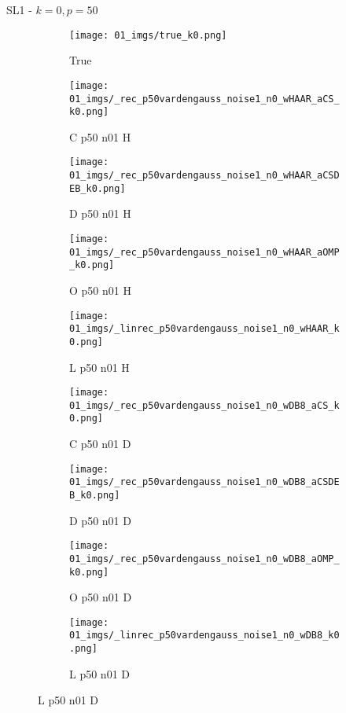 \begin{frame}{SL1 - $k=0,p=50$}{}
\begin{figure}
\begin{subfigure}{0.1\textwidth}
\texttt{[image: 01\_imgs/true\_k0.png]}
\caption*{\Tiny True}
\end{subfigure}
\begin{subfigure}{0.1\textwidth}
\texttt{[image: 01\_imgs/\_rec\_p50vardengauss\_noise1\_n0\_wHAAR\_aCS\_k0.png]}
\caption*{\Tiny C p50 n01 H}
\end{subfigure}
\begin{subfigure}{0.1\textwidth}
\texttt{[image: 01\_imgs/\_rec\_p50vardengauss\_noise1\_n0\_wHAAR\_aCSDEB\_k0.png]}
\caption*{\Tiny D p50 n01 H}
\end{subfigure}
\begin{subfigure}{0.1\textwidth}
\texttt{[image: 01\_imgs/\_rec\_p50vardengauss\_noise1\_n0\_wHAAR\_aOMP\_k0.png]}
\caption*{\Tiny O p50 n01 H}
\end{subfigure}
\begin{subfigure}{0.1\textwidth}
\texttt{[image: 01\_imgs/\_linrec\_p50vardengauss\_noise1\_n0\_wHAAR\_k0.png]}
\caption*{\Tiny L p50 n01 H}
\end{subfigure}
\begin{subfigure}{0.1\textwidth}
\texttt{[image: 01\_imgs/\_rec\_p50vardengauss\_noise1\_n0\_wDB8\_aCS\_k0.png]}
\caption*{\Tiny C p50 n01 D}
\end{subfigure}
\begin{subfigure}{0.1\textwidth}
\texttt{[image: 01\_imgs/\_rec\_p50vardengauss\_noise1\_n0\_wDB8\_aCSDEB\_k0.png]}
\caption*{\Tiny D p50 n01 D}
\end{subfigure}
\begin{subfigure}{0.1\textwidth}
\texttt{[image: 01\_imgs/\_rec\_p50vardengauss\_noise1\_n0\_wDB8\_aOMP\_k0.png]}
\caption*{\Tiny O p50 n01 D}
\end{subfigure}
\begin{subfigure}{0.1\textwidth}
\texttt{[image: 01\_imgs/\_linrec\_p50vardengauss\_noise1\_n0\_wDB8\_k0.png]}
\caption*{\Tiny L p50 n01 D}
\end{subfigure}

\vspace{5pt}


\end{figure}
\end{frame}
